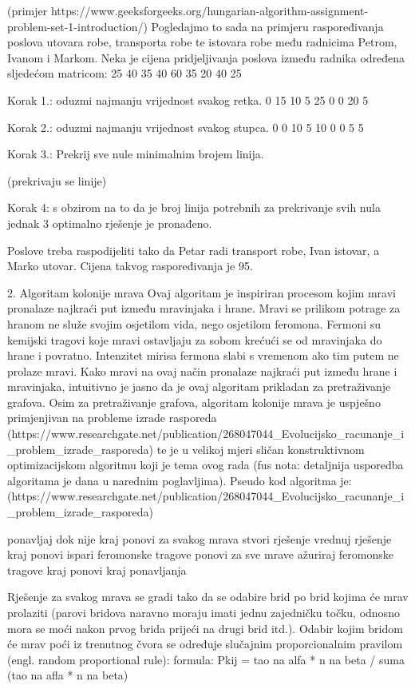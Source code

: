 (primjer https://www.geeksforgeeks.org/hungarian-algorithm-assignment-problem-set-1-introduction/)
Pogledajmo to sada na primjeru raspoređivanja poslova utovara robe, transporta robe te istovara robe među radnicima Petrom, Ivanom i Markom.
Neka je cijena pridjeljivanja poslova između radnika određena sljedećom matricom:
25 40 35
40 60 35
20 40 25

Korak 1.: oduzmi najmanju vrijednost svakog retka.
0 15 10
5 25 0
0 20 5

Korak 2.: oduzmi najmanju vrijednost svakog stupca.
0 0  10
5 10 0
0 5  5

Korak 3.: Prekrij sve nule minimalnim brojem linija.

(prekrivaju se linije)


Korak 4: s obzirom na to da je broj linija potrebnih za prekrivanje svih nula jednak 3 optimalno rješenje je pronađeno.

Poslove treba raspodijeliti tako da Petar radi transport robe, Ivan istovar, a Marko utovar. Cijena takvog raspoređivanja je 95.





2. Algoritam kolonije mrava
Ovaj algoritam je inspiriran procesom kojim mravi pronalaze najkraći put između mravinjaka i hrane. Mravi se prilikom potrage za hranom ne
služe svojim osjetilom vida, nego osjetilom feromona. Fermoni su kemijski tragovi koje mravi ostavljaju za sobom krećući se od
mravinjaka do hrane i povratno. Intenzitet mirisa fermona slabi s vremenom ako tim putem ne prolaze mravi. Kako mravi na ovaj način pronalaze
najkraći put između hrane i mravinjaka, intuitivno je jasno da je ovaj algoritam prikladan za pretraživanje grafova. Osim za pretraživanje grafova,
algoritam kolonije mrava je uspješno primjenjivan na probleme izrade rasporeda (https://www.researchgate.net/publication/268047044_Evolucijsko_racunanje_i_problem_izrade_rasporeda)
te je u velikoj mjeri sličan konstruktivnom optimizacijskom algoritmu koji je tema ovog rada (fus nota: detaljnija usporedba algoritama je dana u narednim poglavljima).
Pseudo kod algoritma je: (https://www.researchgate.net/publication/268047044_Evolucijsko_racunanje_i_problem_izrade_rasporeda)

ponavljaj dok nije kraj
  ponovi za svakog mrava
    stvori rješenje
    vrednuj rješenje
  kraj ponovi
  ispari feromonske tragove
  ponovi za sve mrave
      ažuriraj feromonske tragove
  kraj ponovi
kraj ponavljanja


Rješenje za svakog mrava se gradi tako da se odabire brid po brid kojima će mrav prolaziti (parovi bridova naravno moraju imati jednu
zajedničku točku, odnosno mora se moći nakon prvog brida prijeći na drugi brid itd.). Odabir kojim bridom će mrav poći iz trenutnog čvora
se određuje slučajnim proporcionalnim pravilom (engl. random proportional rule):
formula: Pkij = tao na alfa * n na beta / suma (tao na afla * n na beta)

